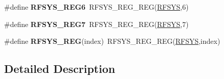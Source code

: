 \begin{DoxyCompactItemize}
\item 
\#define {\bfseries R\+F\+S\+Y\+S\+\_\+\+R\+E\+G6}~R\+F\+S\+Y\+S\+\_\+\+R\+E\+G\+\_\+\+R\+EG(\hyperlink{group__RFSYS__Peripheral__Access__Layer_ga83a5a75f5421c69ce93437b8be3c1144}{R\+F\+S\+YS},6)\hypertarget{group__RFSYS__Register__Accessor__Macros_ga1fec8a3f3c899d0e91a212d5d8d60e0e}{}\label{group__RFSYS__Register__Accessor__Macros_ga1fec8a3f3c899d0e91a212d5d8d60e0e}

\item 
\#define {\bfseries R\+F\+S\+Y\+S\+\_\+\+R\+E\+G7}~R\+F\+S\+Y\+S\+\_\+\+R\+E\+G\+\_\+\+R\+EG(\hyperlink{group__RFSYS__Peripheral__Access__Layer_ga83a5a75f5421c69ce93437b8be3c1144}{R\+F\+S\+YS},7)\hypertarget{group__RFSYS__Register__Accessor__Macros_gaf25af9e067ebffe9129b6fb10078aa85}{}\label{group__RFSYS__Register__Accessor__Macros_gaf25af9e067ebffe9129b6fb10078aa85}

\item 
\#define {\bfseries R\+F\+S\+Y\+S\+\_\+\+R\+EG}(index)~R\+F\+S\+Y\+S\+\_\+\+R\+E\+G\+\_\+\+R\+EG(\hyperlink{group__RFSYS__Peripheral__Access__Layer_ga83a5a75f5421c69ce93437b8be3c1144}{R\+F\+S\+YS},index)\hypertarget{group__RFSYS__Register__Accessor__Macros_ga78ce264b3749af3e7c694e856b61c4dd}{}\label{group__RFSYS__Register__Accessor__Macros_ga78ce264b3749af3e7c694e856b61c4dd}

\end{DoxyCompactItemize}


\subsection{Detailed Description}
